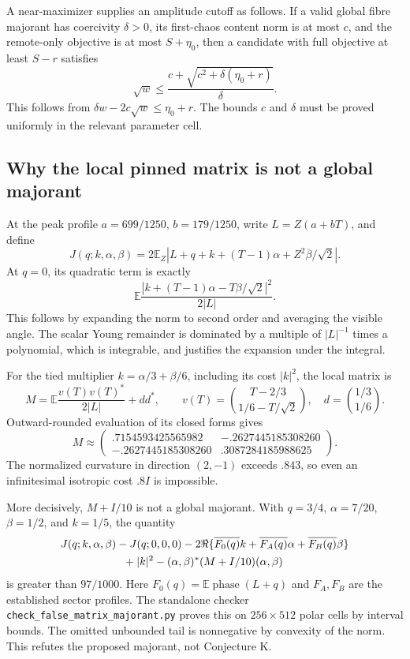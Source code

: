 A near-maximizer supplies an amplitude cutoff as follows. If a valid
global fibre majorant has coercivity $\delta>0$, its first-chaos content
norm is at most $c$, and the remote-only objective is at most $S+\eta_0$,
then a candidate with full objective at least $S-r$ satisfies
\[
 \sqrt w\le\frac{c+\sqrt{c^2+\delta(\eta_0+r)}}{\delta}.
\]
This follows from $\delta w-2c\sqrt w\le\eta_0+r$. The bounds $c$ and
$\delta$ must be proved uniformly in the relevant parameter cell.

\subsection{Why the local pinned matrix is not a global majorant}
At the peak profile $a=699/1250$, $b=179/1250$, write
$L=Z(a+bT)$, and define
\[
 J(q;k,\alpha,\beta)=2\mathbb E_Z
 |L+q+k+(T-1)\alpha+Z^2\overline\beta/\sqrt2|.
\]
At $q=0$, its quadratic term is exactly
\[
 \mathbb E\frac{|k+(T-1)\alpha-T\beta/\sqrt2|^2}{2|L|}.
\]
This follows by expanding the norm to second order and averaging the
visible angle. The scalar Young remainder is dominated by a multiple
of $|L|^{-1}$ times a polynomial, which is integrable, and justifies the
expansion under the integral.

For the tied multiplier $k=\alpha/3+\beta/6$, including its cost $|k|^2$,
the local matrix is
\[
 M=\mathbb E\frac{v(T)v(T)^*}{2|L|}+dd^*,\qquad
 v(T)=\binom{T-2/3}{1/6-T/\sqrt2},\quad
 d=\binom{1/3}{1/6}.
\]
Outward-rounded evaluation of its closed forms gives
\[
 M\approx\begin{pmatrix}
 .7154593425565982&-.2627445185308260\\
 -.2627445185308260&.3087284185988625
 \end{pmatrix}.
\]
The normalized curvature in direction $(2,-1)$ exceeds $.843$, so even
an infinitesimal isotropic cost $.8I$ is impossible.

More decisively, $M+I/10$ is not a global majorant. With
$q=3/4$, $\alpha=7/20$, $\beta=1/2$, and $k=1/5$, the quantity
\[
 \begin{split}
 &J(q;k,\alpha,\beta)-J(q;0,0,0)
 -2\Re\{\overline{F_0(q)}k+
          \overline{F_A(q)}\alpha+\overline{F_B(q)}\beta\}\\
 &\hspace{20mm}+|k|^2-(\alpha,\beta)^*(M+I/10)(\alpha,\beta)
 \end{split}
\]
is greater than $97/1000$. Here $F_0(q)=\mathbb E\operatorname{phase}(L+q)$
and $F_A,F_B$ are the established sector profiles. The standalone
checker \texttt{check\_false\_matrix\_majorant.py} proves this on
$256\times512$ polar cells by interval bounds. The omitted unbounded
tail is nonnegative by convexity of the norm. This refutes the proposed
majorant, not Conjecture K.

